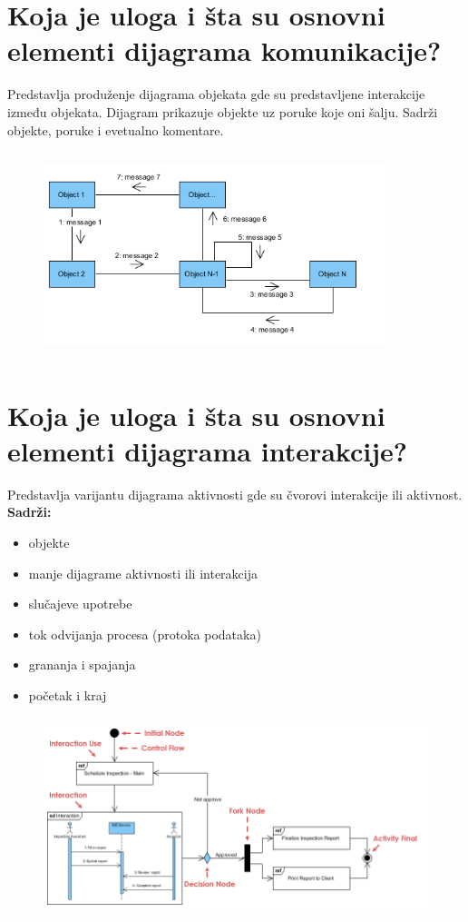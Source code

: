 \documentclass[a4paper]{article}
\begin{document}
\section{Koja je uloga i šta su osnovni elementi dijagrama komunikacije?}
  Predstavlja produženje dijagrama objekata gde su predstavljene interakcije između objekata.
  Dijagram prikazuje objekte uz poruke koje oni šalju. Sadrži objekte, poruke i evetualno komentare.
  \begin{figure}[H]
    \begin{center}
        \includegraphics[width=100mm,height=60mm]{Slike/dijagram_komunikacije.png}
    \end{center}
  \end{figure} 

\section{Koja je uloga i šta su osnovni elementi dijagrama interakcije?}
  Predstavlja varijantu dijagrama aktivnosti gde su čvorovi interakcije ili aktivnost.\\
  \textbf{Sadrži:}
  \begin{itemize}
    \item objekte
    \item manje dijagrame aktivnosti ili interakcija
    \item slučajeve upotrebe
    \item tok odvijanja procesa (protoka podataka)
    \item grananja i spajanja
    \item početak i kraj
  \end{itemize}
  \begin{figure}[H]
    \begin{center}
        \includegraphics[width=120mm,height=60mm]{Slike/dijagram_interakcije.png}
    \end{center}
  \end{figure} 
\end{document}
